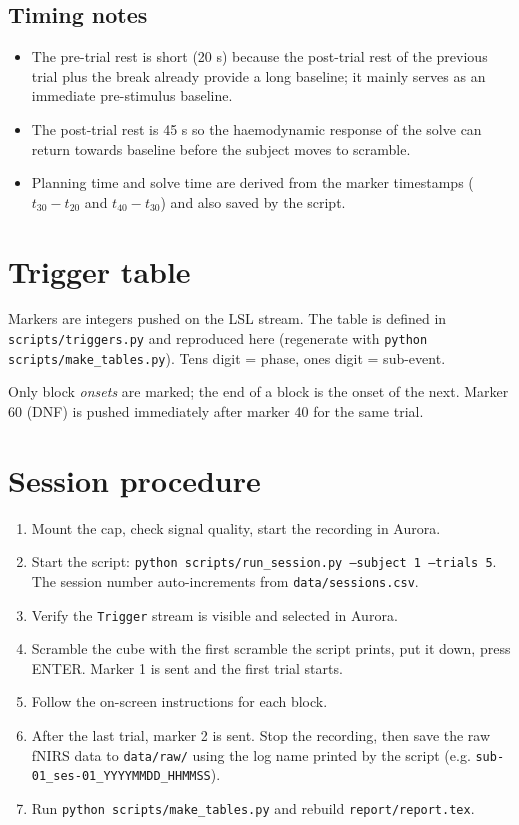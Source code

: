 \documentclass[11pt,a4paper]{article}
\begin{document}
\subsection*{Timing notes}
\begin{itemize}[nosep]
  \item The pre-trial rest is short (20 s) because the post-trial rest of the
        previous trial plus the break already provide a long baseline; it mainly
        serves as an immediate pre-stimulus baseline.
  \item The post-trial rest is 45 s so the haemodynamic response of the solve can
        return towards baseline before the subject moves to scramble.
  \item Planning time and solve time are derived from the marker timestamps
        ($t_{30}-t_{20}$ and $t_{40}-t_{30}$) and also saved by the script.
\end{itemize}

\section{Trigger table}
Markers are integers pushed on the LSL stream. The table is defined in
\texttt{scripts/triggers.py} and reproduced here (regenerate with
\texttt{python scripts/make\_tables.py}). Tens digit = phase, ones digit = sub-event.

\begin{center}

\end{center}

Only block \emph{onsets} are marked; the end of a block is the onset of the next.
Marker 60 (DNF) is pushed immediately after marker 40 for the same trial.

\section{Session procedure}
\begin{enumerate}[nosep]
  \item Mount the cap, check signal quality, start the recording in Aurora.
  \item Start the script: \texttt{python scripts/run\_session.py --subject 1 --trials 5}.
        The session number auto-increments from \texttt{data/sessions.csv}.
  \item Verify the \texttt{Trigger} stream is visible and selected in Aurora.
  \item Scramble the cube with the first scramble the script prints, put it down,
        press ENTER. Marker 1 is sent and the first trial starts.
  \item Follow the on-screen instructions for each block.
  \item After the last trial, marker 2 is sent. Stop the recording, then save the
        raw fNIRS data to \texttt{data/raw/} using the log name printed by the
        script (e.g. \texttt{sub-01\_ses-01\_YYYYMMDD\_HHMMSS}).
  \item Run \texttt{python scripts/make\_tables.py} and rebuild \texttt{report/report.tex}.
\end{enumerate}
\end{document}
